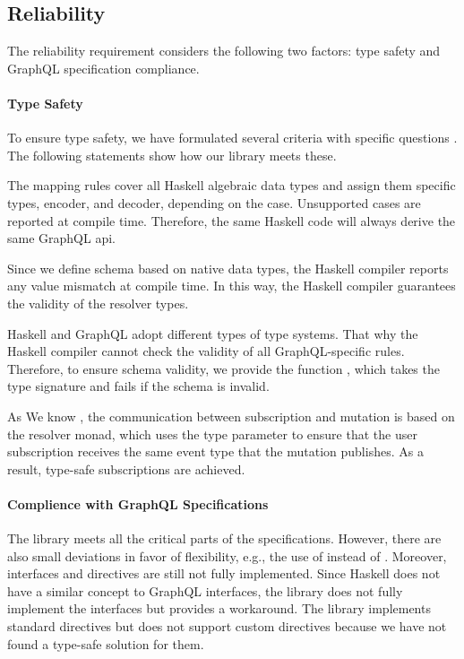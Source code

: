 \begin{frame}
\subsection{Reliability}

The reliability requirement considers the following two factors: type safety and GraphQL specification compliance.

\paragraph{Type Safety} To ensure type safety, we have formulated several criteria with specific questions . The following statements show how our library meets these.
  
  \begin{enumerate}

     The mapping rules cover all Haskell algebraic data types and assign them specific types, encoder, and decoder, depending on the case. Unsupported cases are reported at compile time. Therefore, the same Haskell code will always derive the same GraphQL \gls{api}. 

     Since we define schema based on native data types, the Haskell compiler reports any value mismatch at compile time. In this way, the Haskell compiler guarantees the validity of the resolver types.
    
     Haskell and GraphQL adopt different types of type systems. That why the Haskell compiler cannot check the validity of all GraphQL-specific rules. Therefore, to ensure schema validity, we provide the function , which takes the  type signature and fails if the schema is invalid.
  
     As We know , the communication between subscription and mutation is based on the resolver monad, which uses the type parameter  to ensure that the user subscription receives the same event type that the mutation publishes.   As a result, type-safe subscriptions are achieved.

  \end{enumerate}

\paragraph{Complience with GraphQL Specifications} 
The library meets all the critical parts of the specifications. However, there are also small deviations in favor of flexibility, e.g., the use of  instead of . Moreover, interfaces and directives are still not fully implemented. Since Haskell does not have a similar concept to GraphQL interfaces, the library does not fully implement the interfaces but provides a workaround. The library implements standard directives but does not support custom directives because we have not found a type-safe solution for them.


\end{frame}
